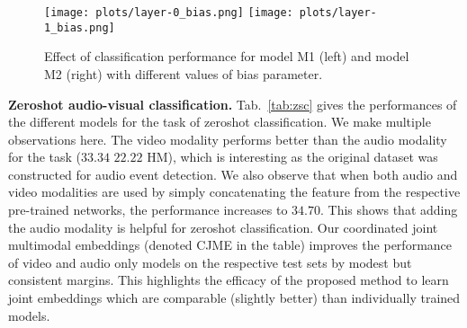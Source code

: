 \begin{figure}
\centering
	\texttt{[image: plots/layer-0\_bias.png]}
	\texttt{[image: plots/layer-1\_bias.png]}
\caption{Effect of classification performance for model M1 (left) and model M2 (right) with different values of bias parameter.
}
\label{fig:bias_corr}
\end{figure}
\begin{table}
\centering
{}
\caption{Zeroshot classification performances (\% mAcc) achieved with audio only, video only, and both audio and video used for training and test. Note that the audio and video concatenation model requires both the modalities to be available during testing.}
\label{tab:zsc}
\vspace{-1 em}
\end{table}
\vspace{0.5em}
\textbf{Zeroshot audio-visual classification.}
Tab.~\ref{tab:zsc} gives the performances of the different models for the task of zeroshot classification. We make multiple observations here. The video modality performs better than the audio modality for the task ($33.34$ \vs $22.22$ HM), which is interesting as the original dataset was constructed for audio event detection. We also observe that when both audio and video modalities are used by simply concatenating the feature from the respective pre-trained networks, the performance increases to $34.70$. This shows that adding the audio modality is helpful for zeroshot classification. Our coordinated joint multimodal embeddings (denoted CJME in the table) improves the performance of video and audio only models on the respective test sets by modest but consistent margins. This highlights the efficacy of the proposed method to learn joint embeddings which are comparable (slightly better) than individually trained models.

